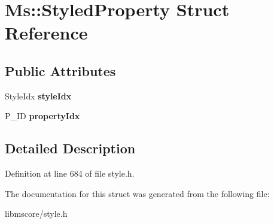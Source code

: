 \hypertarget{struct_ms_1_1_styled_property}{}\section{Ms\+:\+:Styled\+Property Struct Reference}
\label{struct_ms_1_1_styled_property}
\subsection*{Public Attributes}
\begin{DoxyCompactItemize}
\item 
\mbox{\label{struct_ms_1_1_styled_property_a25f5805cb52db2650825df51294be7d2}} 
Style\+Idx {\bfseries style\+Idx}
\item 
\mbox{\label{struct_ms_1_1_styled_property_a164658c0c78f8b7689458889ab37e611}} 
P\+\_\+\+ID {\bfseries property\+Idx}
\end{DoxyCompactItemize}


\subsection{Detailed Description}


Definition at line 684 of file style.\+h.



The documentation for this struct was generated from the following file\+:\begin{DoxyCompactItemize}
\item 
libmscore/style.\+h\end{DoxyCompactItemize}

